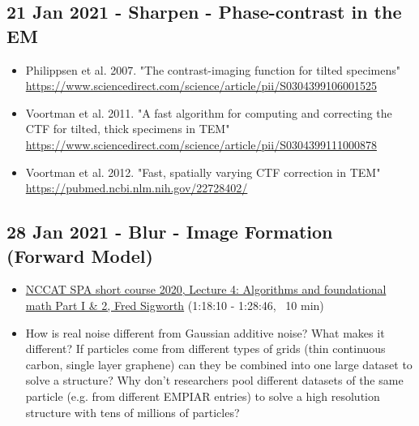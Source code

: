 \documentclass[11pt, oneside]{article}   	%
\begin{document}
\pagebreak
\subsection{21 Jan 2021 - Sharpen - Phase-contrast in the EM}
\begin{itemize}
	\item  Philippsen et al. 2007. "The contrast-imaging function for tilted specimens" \url{https://www.sciencedirect.com/science/article/pii/S0304399106001525}
	\item Voortman et al. 2011. "A fast algorithm for computing and correcting the CTF for tilted, thick specimens in TEM" \url{https://www.sciencedirect.com/science/article/pii/S0304399111000878}
	\item Voortman et al. 2012. "Fast, spatially varying CTF correction in TEM" \url{https://pubmed.ncbi.nlm.nih.gov/22728402/}	
\end{itemize}

\pagebreak
\subsection{28 Jan 2021 - Blur - Image Formation (Forward Model)}
\begin{itemize}
	\item \href{https://youtu.be/tzv5c5K7MEk?t=4690}{NCCAT SPA short course 2020, Lecture 4: Algorithms and foundational math Part I \& 2, Fred Sigworth} (1:18:10 - 1:28:46, ~10 min)
	\end{itemize}
\begin{itemize}
	\item How is real noise different from Gaussian additive noise? What makes it different? If particles come from different types of grids (thin continuous carbon, single layer graphene) can they be combined into one large dataset to solve a structure? Why don't researchers pool different datasets of the same particle (e.g. from different EMPIAR entries) to solve a high resolution structure with tens of millions of particles?
\end{itemize}
\end{document}
